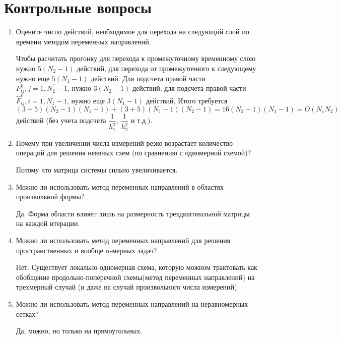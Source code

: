 \documentclass[12pt, a4paper]{article}
\begin{document}
\section{Контрольные вопросы}
\begin{enumerate}
\item Оцените число действий, необходимое для перехода на следующий слой по времени методом переменных направлений.

Чтобы расчитать прогонку для перехода к промежуточному временному слою нужно $5(N_2-1)$ действий, для перехода от промежуточного к следующему нужно еще $5(N_1-1)$ действий. Для подсчета правой части $F_{ij}^k, j = \overline{1,N_2-1}$, нужно $3(N_2 - 1)$ действий, для подсчета правой части $\hat{F}_{ij}^k, i = \overline{1,N_1-1}$, нужно еще $3(N_1 - 1)$ действий. Итого требуется
\[
(3 + 5)(N_2-1)(N_1-1) + (3 + 5)(N_1-1)(N_2 - 1) = 16(N_2-1)(N_1-1) = O(N_1N_2)
\]
действий (без учета подсчета $\dfrac{1}{h_1^2}$, $\dfrac{1}{h_2^2}$ и т.д.).

\item Почему при увеличении числа измерений резко возрастает количество операций для решения неявных схем (по сравнению с одномерной схемой)?

Потому что матрица системы сильно увеличивается.

\item Можно ли использовать метод переменных направлений в
областях произвольной формы?

Да. Форма области влияет лишь на размерность трехдиагональной матрицы на каждой итерации. 


\item Можно ли использовать метод переменных направлений для решения пространственных и вообще $n$-мерных задач?

Нет. Существует локально-одномерная схема, которую можном трактовать как обобщение продольно-поперечной схемы(метод переменных направлений) на трехмерный случай (и даже на случай произвольного числа измерений). 

\item Можно ли использовать метод переменных направлений на неравномерных сетках?

Да, можно, но только на прямоугольных.
\end{enumerate}


\newpage
\end{document}
